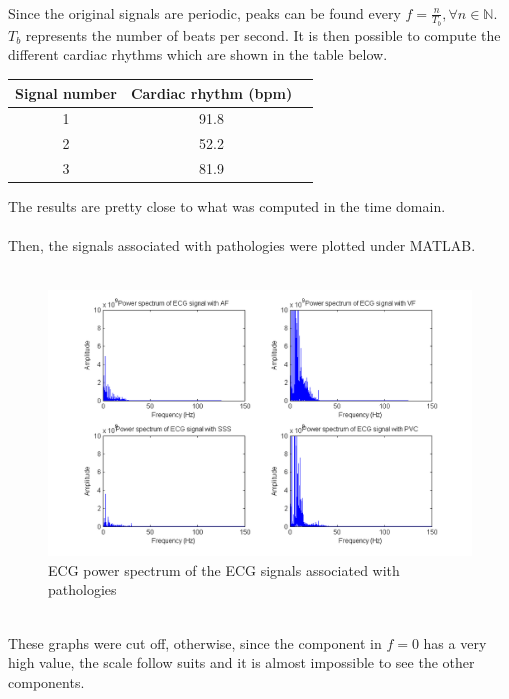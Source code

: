 \documentclass[11pt]{article}
\begin{document}
		\\
		Since the original signals are periodic, peaks can be found every $f = \frac{n}{T_b}, \forall n \in \mathbb{N}$.\\
		$T_b$ represents the number of beats per second. It is then possible to compute the different cardiac rhythms which are shown in the table below.\\
		\begin{center}
			\begin{tabular}{|c|c|c|}
				\hline
				\textbf{Signal number} & \textbf{Cardiac rhythm (bpm)} \\
				\hline
				1 & 91.8 \\ 
				\hline
				2 & 52.2 \\
				\hline
				3 & 81.9 \\
				\hline
			\end{tabular}
		\end{center}
		The results are pretty close to what was computed in the time domain.\\
		\\
		Then, the signals associated with pathologies were plotted under MATLAB.\\
		\\
		\begin{figure}[ht]
			\centering
			\includegraphics[scale=0.65]{images/Q322.png}
			\caption{ECG power spectrum of the ECG signals associated with pathologies}
			\label{Q322}
		\end{figure}
		\\
		These graphs were cut off, otherwise, since the component in $f = 0$ has a very high value, the scale follow suits and it is almost impossible to see the other components.\\
\end{document}
